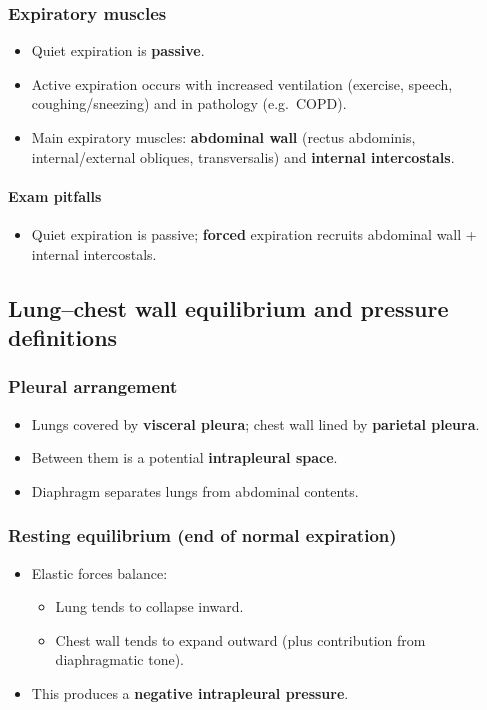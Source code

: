 \documentclass[11pt,a4paper]{article}
\begin{document}
\subsubsection{Expiratory muscles}
\begin{itemize}[leftmargin=*,nosep]
  \item Quiet expiration is \textbf{passive}.
  \item Active expiration occurs with increased ventilation (exercise, speech, coughing/sneezing) and in pathology (e.g.\ COPD).
  \item Main expiratory muscles: \textbf{abdominal wall} (rectus abdominis, internal/external obliques, transversalis) and \textbf{internal intercostals}.
\end{itemize}

\paragraph{Exam pitfalls}
\begin{itemize}[leftmargin=*,nosep]
  \item Quiet expiration is passive; \textbf{forced} expiration recruits abdominal wall + internal intercostals.
\end{itemize}

\subsection{Lung--chest wall equilibrium and pressure definitions}

\subsubsection{Pleural arrangement}
\begin{itemize}[leftmargin=*,nosep]
  \item Lungs covered by \textbf{visceral pleura}; chest wall lined by \textbf{parietal pleura}.
  \item Between them is a potential \textbf{intrapleural space}.
  \item Diaphragm separates lungs from abdominal contents.
\end{itemize}

\subsubsection{Resting equilibrium (end of normal expiration)}
\begin{itemize}[leftmargin=*,nosep]
  \item Elastic forces balance:
  \begin{itemize}[leftmargin=*,nosep]
    \item Lung tends to collapse inward.
    \item Chest wall tends to expand outward (plus contribution from diaphragmatic tone).
  \end{itemize}
  \item This produces a \textbf{negative intrapleural pressure}.
\end{itemize}
\end{document}
